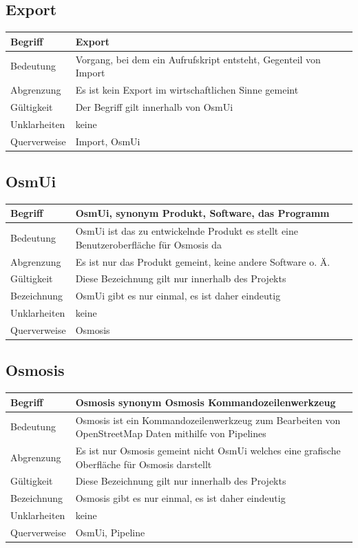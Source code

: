 \documentclass[a4paper,12pt]{scrartcl}
\begin{document}
\begin{center}
\subsection{Export}
\begin{tabular}{|p{5cm}|p{10cm}|}
\hline Begriff & \textbf{Export}\\
\hline Bedeutung & Vorgang, bei dem ein Aufrufskript entsteht, Gegenteil von Import \\ 
\hline Abgrenzung & Es ist kein Export im wirtschaftlichen  Sinne gemeint\\ 
\hline Gültigkeit & Der Begriff gilt innerhalb von OsmUi \\ 
\hline Unklarheiten & keine \\ 
\hline Querverweise & Import, OsmUi \\ 
\hline
\end{tabular}
\subsection{OsmUi}
\begin{tabular}{|p{5cm}|p{10cm}|}
\hline Begriff & \textbf{OsmUi}, synonym Produkt, Software, das Programm \\ 
\hline Bedeutung & OsmUi ist das zu entwickelnde Produkt es stellt eine Benutzeroberfläche für Osmosis da \\ 
\hline Abgrenzung & Es ist nur das Produkt gemeint, keine andere Software o. Ä. \\ 
\hline Gültigkeit & Diese Bezeichnung gilt nur innerhalb des Projekts \\ 
\hline Bezeichnung & OsmUi gibt es nur einmal, es ist daher eindeutig \\ 
\hline Unklarheiten & keine \\ 
\hline Querverweise & Osmosis \\ 
\hline 
\end{tabular}
\subsection{Osmosis}
\begin{tabular}{|p{5cm}|p{10cm}|}
\hline Begriff & \textbf{Osmosis} synonym Osmosis Kommandozeilenwerkzeug\\ 
\hline Bedeutung & Osmosis ist ein Kommandozeilenwerkzeug zum Bearbeiten von OpenStreetMap Daten mithilfe von Pipelines \\ 
\hline Abgrenzung & Es ist nur Osmosis gemeint nicht OsmUi welches eine grafische Oberfläche für Osmosis darstellt\\ 
\hline Gültigkeit & Diese Bezeichnung gilt nur innerhalb des Projekts \\ 
\hline Bezeichnung & Osmosis gibt es nur einmal, es ist daher eindeutig \\ 
\hline Unklarheiten & keine \\ 
\hline Querverweise & OsmUi, Pipeline \\ 
\hline 
\end{tabular}

\end{center}
\end{document}

